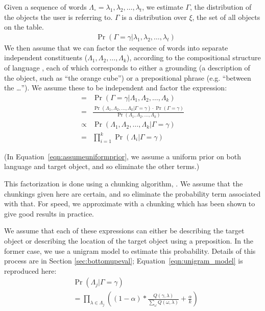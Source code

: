 \documentclass[conference]{IEEEtran}
\numberwithin{equation}{section}
\begin{document}
Given a sequence of words $\Lambda_\circ = \lambda_1, \lambda_2, \ldots, \lambda_t$, we estimate $\Gamma$, the distribution of the objects the user is referring to. $\Gamma$ is a distribution over $\xi$, the set of all objects on the table.
\begin{align}
	& \Pr(\Gamma = \gamma | \lambda_1, \lambda_2, \ldots, \lambda_t)
\end{align}
We then assume that we can factor the sequence of words into separate independent constituents ($\Lambda_1, \Lambda_2, \ldots, \Lambda_k$), according to the compositional structure of language \citep{heim1998semantics}, each of which corresponds to either a grounding (a description of the object, such as ``the orange cube'') or a prepositional phrase (e.g. ``between the \ldots''). We assume these to be independent and factor the expression:
\begin{align}
   = & \Pr(\Gamma = \gamma | \Lambda_1, \Lambda_2, \ldots, \Lambda_k) 
\\ = & \frac{\Pr(\Lambda_1, \Lambda_2, \ldots, \Lambda_k | \Gamma = \gamma) \cdot \Pr(\Gamma = \gamma)}{\Pr(\Lambda_1, \Lambda_2, \ldots, \Lambda_k)}
\\ \propto & \Pr(\Lambda_1, \Lambda_2, \ldots, \Lambda_k | \Gamma = \gamma)\label{eqn:assumeuniformprior}
\\ = & \prod_{i=1}^k \Pr(\Lambda_i | \Gamma = \gamma) \label{eqn:combinedistribs}
\end{align}

(In Equation~\ref{eqn:assumeuniformprior}, we assume a uniform prior on both language and target object, and so eliminate the other terms.)

This factorization is done using a chunking algorithm, \citep{McCallumMALLET}. We assume that the chunkings given here are certain, and so eliminate the probability term associated with that. For speed, we approximate with a chunking which has been shown to give good results in practice.

We assume that each of these expressions can either be describing the target object or describing the location of the target object using a preposition. In the former case, we use a unigram model to estimate this probability. Details of this process are in Section \ref{sec:bottomupeval}; Equation~\ref{eqn:unigram_model} is reproduced here:
\begin{align*}
   & \Pr(\Lambda_j | \Gamma = \gamma) 
\\ & = \prod_{\lambda \in \Lambda_j} \left( (1 - \alpha) * \frac{Q(\gamma, \lambda)}{\sum_{\omega} Q(\omega, \lambda)} + \frac{\alpha}{k} \right) \end{align*}
\end{document}
